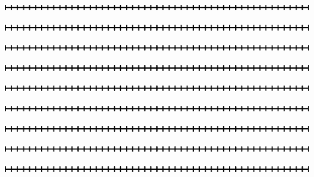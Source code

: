 \newpage
\thispagestyle{empty}
\begin{center}
	\includegraphics[]{50}
\end{center}
\vspace{2cm}
\begin{center}
	\includegraphics[]{50}
\end{center}
\vspace{2cm}
\begin{center}
	\includegraphics[]{50}
\end{center}
\vspace{2cm}
\begin{center}
	\includegraphics[]{50}
\end{center}
\vspace{2cm}
\begin{center}
	\includegraphics[]{50}
\end{center}
\vspace{2cm}
\begin{center}
	\includegraphics[]{50}
\end{center}
\vspace{2cm}
\begin{center}
	\includegraphics[]{50}
\end{center}
\vspace{2cm}
\begin{center}
	\includegraphics[]{50}
\end{center}
\vspace{2cm}
\begin{center}
	\includegraphics[]{50}
\end{center}
